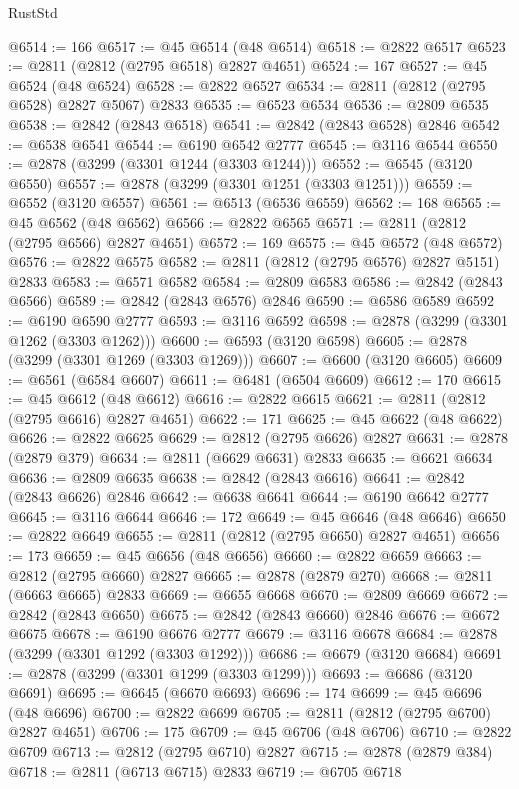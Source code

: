 \begin{lexlean}{RustStd}
\begin{coremodule}
{\begin{coremodule}
{{{{{{{{{{{{{{{{{{{{{{{{{{{{{{{{{@6514 := 166
@6517 := @45 @6514 (@48 @6514)
@6518 := @2822 @6517
@6523 := @2811 (@2812 (@2795 @6518) @2827 @4651)
@6524 := 167
@6527 := @45 @6524 (@48 @6524)
@6528 := @2822 @6527
@6534 := @2811 (@2812 (@2795 @6528) @2827 @5067) @2833
@6535 := @6523 @6534
@6536 := @2809 @6535
@6538 := @2842 (@2843 @6518)
@6541 := @2842 (@2843 @6528) @2846
@6542 := @6538 @6541
@6544 := @6190 @6542 @2777
@6545 := @3116 @6544
@6550 := @2878 (@3299 (@3301 @1244 (@3303 @1244)))
@6552 := @6545 (@3120 @6550)
@6557 := @2878 (@3299 (@3301 @1251 (@3303 @1251)))
@6559 := @6552 (@3120 @6557)
@6561 := @6513 (@6536 @6559)
@6562 := 168
@6565 := @45 @6562 (@48 @6562)
@6566 := @2822 @6565
@6571 := @2811 (@2812 (@2795 @6566) @2827 @4651)
@6572 := 169
@6575 := @45 @6572 (@48 @6572)
@6576 := @2822 @6575
@6582 := @2811 (@2812 (@2795 @6576) @2827 @5151) @2833
@6583 := @6571 @6582
@6584 := @2809 @6583
@6586 := @2842 (@2843 @6566)
@6589 := @2842 (@2843 @6576) @2846
@6590 := @6586 @6589
@6592 := @6190 @6590 @2777
@6593 := @3116 @6592
@6598 := @2878 (@3299 (@3301 @1262 (@3303 @1262)))
@6600 := @6593 (@3120 @6598)
@6605 := @2878 (@3299 (@3301 @1269 (@3303 @1269)))
@6607 := @6600 (@3120 @6605)
@6609 := @6561 (@6584 @6607)
@6611 := @6481 (@6504 @6609)
@6612 := 170
@6615 := @45 @6612 (@48 @6612)
@6616 := @2822 @6615
@6621 := @2811 (@2812 (@2795 @6616) @2827 @4651)
@6622 := 171
@6625 := @45 @6622 (@48 @6622)
@6626 := @2822 @6625
@6629 := @2812 (@2795 @6626) @2827
@6631 := @2878 (@2879 @379)
@6634 := @2811 (@6629 @6631) @2833
@6635 := @6621 @6634
@6636 := @2809 @6635
@6638 := @2842 (@2843 @6616)
@6641 := @2842 (@2843 @6626) @2846
@6642 := @6638 @6641
@6644 := @6190 @6642 @2777
@6645 := @3116 @6644
@6646 := 172
@6649 := @45 @6646 (@48 @6646)
@6650 := @2822 @6649
@6655 := @2811 (@2812 (@2795 @6650) @2827 @4651)
@6656 := 173
@6659 := @45 @6656 (@48 @6656)
@6660 := @2822 @6659
@6663 := @2812 (@2795 @6660) @2827
@6665 := @2878 (@2879 @270)
@6668 := @2811 (@6663 @6665) @2833
@6669 := @6655 @6668
@6670 := @2809 @6669
@6672 := @2842 (@2843 @6650)
@6675 := @2842 (@2843 @6660) @2846
@6676 := @6672 @6675
@6678 := @6190 @6676 @2777
@6679 := @3116 @6678
@6684 := @2878 (@3299 (@3301 @1292 (@3303 @1292)))
@6686 := @6679 (@3120 @6684)
@6691 := @2878 (@3299 (@3301 @1299 (@3303 @1299)))
@6693 := @6686 (@3120 @6691)
@6695 := @6645 (@6670 @6693)
@6696 := 174
@6699 := @45 @6696 (@48 @6696)
@6700 := @2822 @6699
@6705 := @2811 (@2812 (@2795 @6700) @2827 @4651)
@6706 := 175
@6709 := @45 @6706 (@48 @6706)
@6710 := @2822 @6709
@6713 := @2812 (@2795 @6710) @2827
@6715 := @2878 (@2879 @384)
@6718 := @2811 (@6713 @6715) @2833
@6719 := @6705 @6718
}}}}}}}}}}}}}}}}}}}}}}}}}}}}}}}}}
\end{coremodule}}
\end{coremodule}
\end{lexlean}
